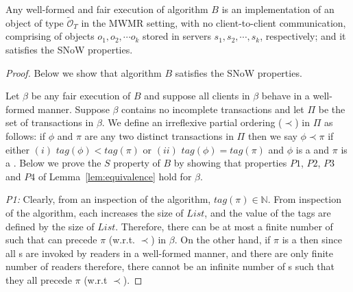 \begin{theorem} Any well-formed  and fair execution of algorithm $B$ is an implementation of  an object of type $\tilde{\mathcal{O}}_T$ in the MWMR setting, 
  with no client-to-client communication,  comprising of objects $o_1, o_2, \cdots o_k$ stored in servers $s_1, s_2, \cdots, s_k$, respectively; and it satisfies the SNoW  properties. %
  \end{theorem}

\begin{proof} Below we show that algorithm $B$ satisfies the  SNoW properties. 
  
  Let $\beta$ be any fair execution  of  $B$ and 
 suppose all clients in $\beta$ behave in a well-formed
manner. Suppose $\beta$ contains no incomplete transactions and let  $\Pi$ be the set of transactions in $\beta$.  We define an irreflexive partial ordering ($\prec$) in $\Pi$ as follows:  if $\phi$ and $\pi$ are any two distinct transactions in $\Pi$ then we say 
  $\phi \prec \pi$ if either $(i)$ $tag(\phi) < tag(\pi)$ or $(ii)$ $tag(\phi) = tag(\pi)$ and $\phi$ is a \wot{} and $\pi$ is a \rot{}. Below we prove the $S$  property of $B$ by showing that  properties $P1$, $P2$, $P3$ and $P4$ of Lemma~\ref{lem:equivalence} hold for $\beta$. 
  
  \emph{P1:}   Clearly, from an inspection of the algorithm, 
   $tag(\pi) \in \mathbb{N}$. From inspection of the algorithm, each \wot{} increases the size of 
   $List$, and the value of the tags are  defined by the size of $List$. Therefore, there can be at 
   most a finite number of \wots{} such that can precede $\pi$ (w.r.t. $\prec$) in $\beta$.
    On the other hand, if $\pi$ is a \rot{} then since all \rot{}s are invoked by readers  in a well-formed manner,  and there are only finite number of readers 
  therefore, there cannot be an infinite number of \rot{}s such that they all 
  precede $\pi$ (w.r.t $\prec$).
  
   
    

\end{proof}
